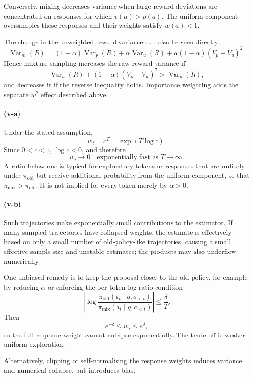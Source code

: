 Conversely, mixing decreases variance when large reward deviations are
concentrated on responses for which $u(a)>p(a)$. The uniform component
oversamples these responses and their weights satisfy $w(a)<1$.

The change in the unweighted reward variance can also be seen directly:
\[
\operatorname{Var}_{m}(R)
=
(1-\alpha)\operatorname{Var}_{p}(R)
+
\alpha\operatorname{Var}_{u}(R)
+
\alpha(1-\alpha)(V_p-V_u)^2.
\]
Hence mixture sampling increases the raw reward variance if
\[
\operatorname{Var}_{u}(R)
+
(1-\alpha)(V_p-V_u)^2
>
\operatorname{Var}_{p}(R),
\]
and decreases it if the reverse inequality holds. Importance weighting adds
the separate $w^2$ effect described above.

\paragraph{(v-a)}
Under the stated assumption,
\[
w_i=c^T=\exp(T\log c).
\]
Since $0<c<1$, $\log c<0$, and therefore
\[
\boxed{
w_i\to0
\quad\text{exponentially fast as }T\to\infty.
}
\]
A ratio below one is typical for exploratory tokens or responses that are
unlikely under $\pi_{\mathrm{old}}$ but receive additional probability from
the uniform component, so that
$\pi_{\mathrm{mix}}>\pi_{\mathrm{old}}$. It is not implied for every token
merely by $\alpha>0$.

\paragraph{(v-b)}
Such trajectories make exponentially small contributions to the estimator.
If many sampled trajectories have collapsed weights, the estimate is
effectively based on only a small number of old-policy-like trajectories,
causing a small effective sample size and unstable estimates; the products may
also underflow numerically.

One unbiased remedy is to keep the proposal closer to the old policy, for
example by reducing $\alpha$ or enforcing the per-token log-ratio condition
\[
\left|
\log
\frac{
\pi_{\mathrm{old}}(a_t\mid q,a_{<t})
}{
\pi_{\mathrm{mix}}(a_t\mid q,a_{<t})
}
\right|
\leq\frac{\delta}{T}.
\]
Then
\[
e^{-\delta}\leq w_i\leq e^\delta,
\]
so the full-response weight cannot collapse exponentially. The trade-off is
weaker uniform exploration.

Alternatively, clipping or self-normalising the response weights reduces
variance and numerical collapse, but introduces bias.
